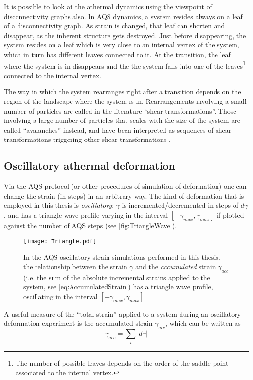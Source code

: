 It is possible to look at the athermal dynamics using the viewpoint of disconnectivity graphs also. 
In AQS dynamics, a system resides always on a leaf of a disconnectivity graph. As strain is changed, that leaf can shorten and disappear, as the inherent structure gets destroyed. Just before disappearing, the system resides on a leaf which is very close to an internal vertex of the system, which in turn has different leaves connected to it. At the transition, the leaf where the system is in disappears and the the system falls into one of the leaves\footnote{The number of possible leaves depends on the order of the saddle point associated to the internal vertex.} connected to the internal vertex. 

The way in which the system rearranges right after a transition depends on the region of the landscape where the system is in. 
Rearrangements involving a small number of particles are called in the literature ``shear transformations''. Those involving a large number of particles that scales with the size of the system are called ``avalanches'' instead, and have been interpreted as sequences of shear transformations triggering other shear transformations \cite{bailey2007avalanche, rodney2011modeling}. 

\subsection{Oscillatory athermal deformation}
Via the AQS protocol (or other procedures of simulation of deformation) one can change the strain (in steps) in an arbitrary way. The kind of deformation that is employed in this thesis is \emph{oscillatory}: $\gamma$ is incremented/decremented in steps of $d\gamma$, and has a triangle wave profile varying in the interval $[-\gamma_{max}, \gamma_{max}]$ if plotted against the number of AQS steps (see \autoref{fig:TriangleWave}).

\begin{figure}[!h] 
\centering 
\texttt{[image: Triangle.pdf]} 
\caption{In the AQS oscillatory strain simulations performed in this thesis, the relationship between the strain $\gamma$ and the \emph{accumulated} strain $\gamma_{acc}$ (i.e. the sum of the absolute incremental strains applied to the system, see \autoref{eq:AccumulatedStrain}) has a triangle wave profile, oscillating in the interval $[-\gamma_{max}, \gamma_{max}]$. \label{fig:TriangleWave}}
\end{figure}

A useful measure of the ``total strain'' applied to a system during an oscillatory deformation experiment is the accumulated strain $\gamma_{acc}$, which can be written as
\begin{equation}
	\gamma_{acc} = \sum_{i} |d\gamma|
	\label{eq:AccumulatedStrain}
\end{equation}

